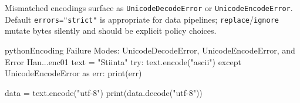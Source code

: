Mismatched encodings surface as \texttt{UnicodeDecodeError} or \texttt{UnicodeEncodeError}. Default \texttt{errors="strict"} is appropriate for data pipelines; \texttt{replace}/\texttt{ignore} mutate bytes silently and should be explicit policy choices.

\begin{codebox}[]{python}{Encoding Failure Modes: UnicodeDecodeError, UnicodeEncodeError, and Error Han...}{enc01}
text = "Stiinta"
try:
    text.encode("ascii")
except UnicodeEncodeError as err:
    print(err)

data = text.encode("utf-8")
print(data.decode("utf-8"))
\end{codebox}


